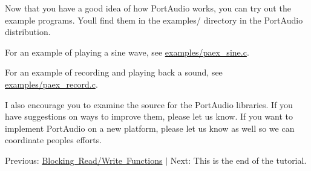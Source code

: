 Now that you have a good idea of how Port\+Audio works, you can try out the example programs. You\textquotesingle{}ll find them in the examples/ directory in the Port\+Audio distribution.

For an example of playing a sine wave, see \mbox{\hyperlink{paex__sine_8c}{examples/paex\+\_\+sine.\+c}}.

For an example of recording and playing back a sound, see \mbox{\hyperlink{paex__record_8c}{examples/paex\+\_\+record.\+c}}.

I also encourage you to examine the source for the Port\+Audio libraries. If you have suggestions on ways to improve them, please let us know. If you want to implement Port\+Audio on a new platform, please let us know as well so we can coordinate people\textquotesingle{}s efforts.

Previous\+: \mbox{\hyperlink{blocking_read_write}{Blocking Read/\+Write Functions}} $\vert$ Next\+: This is the end of the tutorial. 